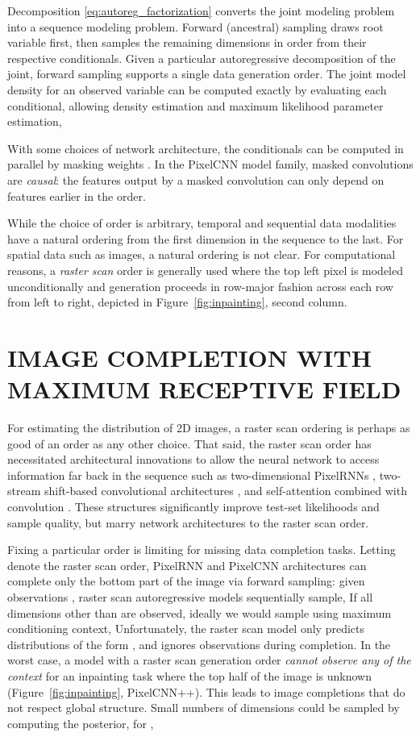 \documentclass[letterpaper]{article}
\begin{document}
Decomposition \eqref{eq:autoreg_factorization} converts the joint modeling problem into a sequence modeling problem. Forward (ancestral) sampling draws root variable  first, then samples the remaining dimensions in order  from their respective conditionals. Given a particular autoregressive decomposition of the joint, forward sampling supports a single data generation order. The joint model density for an observed variable can be computed exactly by evaluating each conditional, allowing density estimation and maximum likelihood parameter estimation,


With some choices of network architecture, the conditionals can be computed in parallel by masking weights \citep{germain2015made, oord2016pixel}. In the PixelCNN model family, masked convolutions are \textit{causal}: the features output by a masked convolution can only depend on features earlier in the order.

While the choice of order is arbitrary, temporal and sequential data modalities have a natural ordering from the first dimension in the sequence to the last. For spatial data such as images, a natural ordering is not clear. For computational reasons, a \textit{raster scan} order is generally used where the top left pixel is modeled unconditionally and generation proceeds in row-major fashion across each row from left to right, depicted in Figure~\ref{fig:inpainting}, second column.


\section{IMAGE COMPLETION WITH MAXIMUM RECEPTIVE FIELD}

For estimating the distribution of 2D images, a raster scan ordering is perhaps as good of an order as any other choice. That said, the raster scan order has necessitated architectural innovations to allow the neural network to access information far back in the sequence such as two-dimensional PixelRNNs \citep{oord2016pixel}, two-stream shift-based convolutional architectures \citep{van2016conditional}, and self-attention combined with convolution \citep{chen2017pixelsnail}. These structures significantly improve test-set likelihoods and sample quality, but marry network architectures to the raster scan order.

Fixing a particular order is limiting for missing data completion tasks. Letting  denote the raster scan order, PixelRNN and PixelCNN architectures can complete only the bottom part of the image via forward sampling: given observations , raster scan autoregressive models sequentially sample, 
If all dimensions other than  are observed, ideally we would sample  using maximum conditioning context, 
Unfortunately, the raster scan model only predicts distributions of the form , and ignores observations  during completion.
In the worst case, a model with a raster scan generation order \textit{cannot observe any of the context} for an inpainting task where the top half of the image is unknown ({Figure~\ref{fig:inpainting}, PixelCNN++}). This leads to image completions that do not respect global structure.
Small numbers of dimensions could be sampled by computing the posterior, \eg{} for ,
\end{document}
